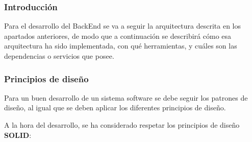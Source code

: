 
    \subsubsection{Introducción}

        Para el desarrollo del BackEnd se va a seguir la arquitectura descrita en los apartados anteriores, de modo que a continuación se describirá cómo esa arquitectura ha sido implementada, con qué herramientas, y cuáles son las dependencias o servicios que posee.

    \subsubsection{Principios de diseño}
    
        Para un buen desarrollo de un sistema software se debe seguir los patrones de diseño, al igual que se deben aplicar los diferentes principios de diseño.
        
        A la hora del desarrollo, se ha considerado respetar los principios de diseño \textbf{SOLID}:
        

